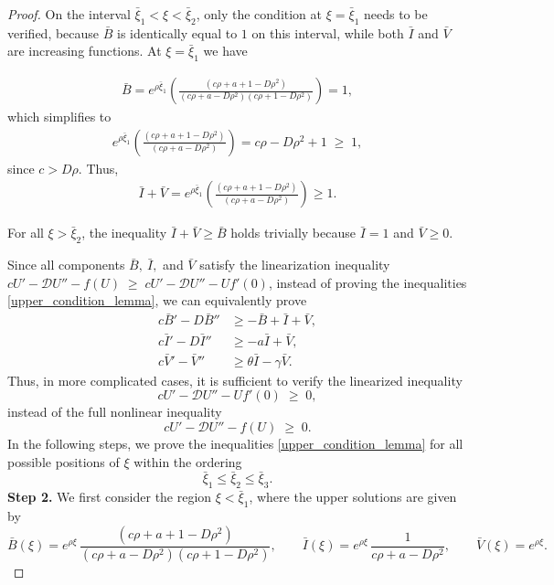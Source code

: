 \documentclass[11pt]{article}
\theoremstyle{definition}
\begin{document}
\begin{proof}
On the interval $\bar{\xi}_1 < \xi < \bar{\xi}_2$, only the condition at 
$\xi = \bar{\xi}_1$ needs to be verified, because $\bar{B}$ is identically 
equal to $1$ on this interval, while both $\bar{I}$ and $\bar{V}$ are 
increasing functions.  
At $\xi = \bar{\xi}_1$ we have

\begin{align}
   \bar{B}= e^{\rho \bar{\xi}_1}
    \left(
     \frac{(c\rho+a+1 - D\rho^2)}
         {(c\rho+a - D\rho^2)(c\rho+1 - D\rho^2)}
    \right)
    = 1,
\end{align}
which simplifies to
\begin{align}
    e^{\rho \bar{\xi}_1}
    \left(
     \frac{(c\rho+a+1 - D\rho^2)}
         {(c\rho+a - D\rho^2)}
    \right)
    = c\rho - D\rho^{2} + 1 \;\ge\; 1,
\end{align}
since $c > D\rho$.  
Thus,
\begin{align}
    \bar{I} + \bar{V}
    = e^{\rho \bar{\xi}_1}
    \left(
        \frac{(c\rho+a+1 - D\rho^2)}
         {(c\rho+a - D\rho^2)}
    \right)
    \ge 1.
\end{align}

For all $\xi > \bar{\xi}_2$, the inequality $\bar{I} + \bar{V} \ge \bar{B}$ holds trivially because  
$\bar{I} = 1$ and $\bar{V} \ge 0$.

Since all components $\bar{B},\ \bar{I},$ and $  \bar{V}$ satisfy the linearization inequality $cU' - \mathcal{D}U'' - f(U) \;\ge\; cU' - \mathcal{D}U'' - Uf'(0)$, instead of proving the inequalities \eqref{upper_condition_lemma}, we can equivalently prove
\begin{align}
    c \bar{B}' - D\bar{B}'' &\ge -\bar{B} + \bar{I} + \bar{V}, \\
    c \bar{I}' - D\bar{I}'' &\ge -a\bar{I} + \bar{V}, \\
    c \bar{V}' - \bar{V}'' &\ge \theta \bar{I} - \gamma \bar{V}.
\end{align}
Thus, in more complicated cases, it is sufficient to verify the linearized inequality
\[
cU' - \mathcal{D}U'' - Uf'(0) \;\ge\; 0,
\]
instead of the full nonlinear inequality
\[
cU' - \mathcal{D}U'' - f(U) \;\ge\; 0.
\]
In the following steps, we prove the inequalities \eqref{upper_condition_lemma} for all possible positions of $\xi$ within the ordering \[\bar{\xi}_1\le \bar{\xi}_2 \le \bar{\xi}_3.\]
\textbf{Step 2.} We first consider the region $\xi < \bar{\xi}_1$, where the upper solutions are given by 
\[
\bar{B}(\xi)= e^{\rho \xi}\,
\frac{(c\rho+a+1 - D\rho^2)}
         {(c\rho+a - D\rho^2)(c\rho+1 - D\rho^2)}, 
\qquad
\bar{I}(\xi)= e^{\rho \xi}\,\frac{1}{c\rho+a-D\rho^2}, 
\qquad
\bar{V}(\xi)= e^{\rho \xi}.
\]


\end{proof}
\end{document}
